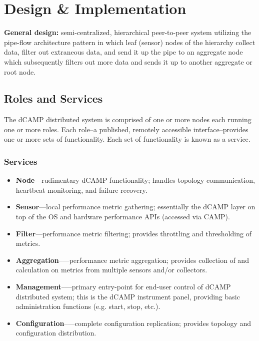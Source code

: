 \chapter{Design \& Implementation}
\label{design_implementation}

\textbf{General design:} semi-centralized, hierarchical peer-to-peer system utilizing the pipe-flow architecture pattern
in which leaf (sensor) nodes of the hierarchy collect data, filter out extraneous data, and send it up the pipe to an
aggregate node which subsequently filters out more data and sends it up to another aggregate or root node.

\section{\dcamp Roles and Services}

The dCAMP distributed system is comprised of one or more nodes each running one or more roles. Each role--a published,
remotely accessible interface--provides one or more sets of functionality. Each set of functionality is known as a
service.

\subsection{Services}

\begin{itemize}

\item \textbf{Node}---rudimentary dCAMP functionality; handles topology communication, heartbeat monitoring, and failure
recovery.

\item \textbf{Sensor}---local performance metric gathering; essentially the dCAMP layer on top of the OS and hardware
performance APIs (accessed via CAMP).

\item \textbf{Filter}---performance metric filtering; provides throttling and thresholding of metrics.

\item \textbf{Aggregation}--—performance metric aggregation; provides collection of and calculation on metrics from
multiple sensors and/or collectors.

\item \textbf{Management}--—primary entry-point for end-user control of dCAMP distributed system; this is the dCAMP
instrument panel, providing basic administration functions (e.g. start, stop, etc.).

\item \textbf{Configuration}--—complete configuration replication; provides topology and configuration distribution.

\end{itemize}

